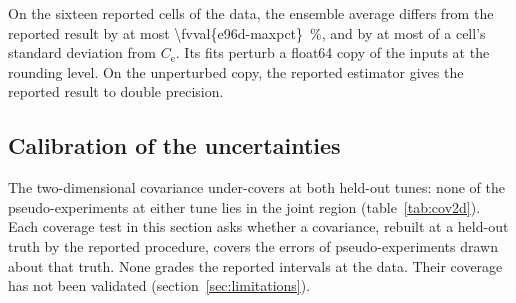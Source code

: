 On the sixteen reported cells of the data, the ensemble average differs from the reported result by at most \SI{\fvval{e96d-maxpct}}{\percent}, and by at most  of a cell's standard deviation from $C_{\mathrm{e}}$. Its fits perturb a float64 copy of the inputs at the rounding level. On the unperturbed copy, the reported estimator gives the reported result to double precision.


\subsection{Calibration of the uncertainties}
\label{sec:calib}
\label{sec:uq2d}
\label{sec:ll5d}%

The two-dimensional covariance under-covers at both held-out tunes: none of the  pseudo-experiments at either tune lies in the joint region (table~\ref{tab:cov2d}). Each coverage test in this section asks whether a covariance, rebuilt at a held-out truth by the reported procedure, covers the errors of pseudo-experiments drawn about that truth. None grades the reported intervals at the data. Their coverage has not been validated (section~\ref{sec:limitations}).

